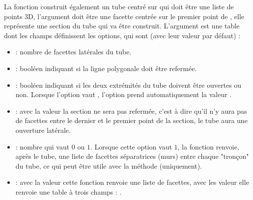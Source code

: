 La fonction  construit également un tube centré sur  qui doit être une liste de points 3D, l'argument  doit être une facette centrée sur le premier point de , elle représente une section du tube qui va être construit. L'argument  est une table dont les champs définissent les options, qui sont (avec leur valeur  par défaut) :
    \begin{itemize}
        \item {} : nombre de facettes latérales du tube.
        
        \item {} : booléen indiquant si la ligne polygonale doit être refermée.
        
        \item {} : booléen indiquant si les deux extrémités du tube doivent être ouvertes ou non. Lorsque l'option  vaut \true, l'option  prend automatiquement la valeur \true.
        
        \item {} : avec la valeur \true la section ne sera pas refermée, c'est à dire qu'il n'y aura pas de facettes entre le dernier et le premier point de la section, le tube aura une ouverture latérale.
        
        \item {} : nombre qui vaut $0$ ou $1$. Lorsque cette option vaut $1$, la fonction renvoie, après le tube, une liste de facettes séparatrices (murs) entre chaque "tronçon" du tube, ce qui peut être utile avec la méthode  (uniquement).
        
        \item {} : avec la valeur \false cette fonction renvoie une liste de facettes, avec les valeur \true elle renvoie une table à trois champs : .        
    \end{itemize}
    
